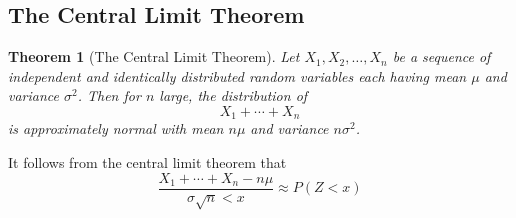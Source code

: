 \documentclass[12pt]{article}
\newtheorem{theorem}{Theorem}
\begin{document}
\subsection{The Central Limit Theorem}

\begin{theorem} [The Central Limit Theorem]
  Let $X_1, X_2,\dots,X_n$ be a sequence of independent and identically distributed random variables each having mean $\mu$ and variance $\sigma^2$. Then for $n$ large, the distribution of
  \begin{equation*}
    X_1 + \cdots + X_n
  \end{equation*}
  is approximately normal with mean $n\mu$ and variance $n\sigma^2$.
\end{theorem}

It follows from the central limit theorem that
\begin{equation*}
  \frac {X_1 + \cdots + X_n - n\mu}{\sigma \sqrt{n} < x} \approx P(Z < x)
\end{equation*}
\end{document}
